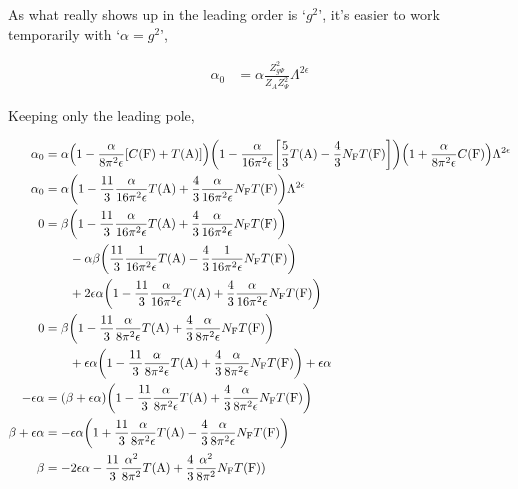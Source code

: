 As what really shows up in the leading order is `$g^2$', it's easier to work temporarily with `$\alpha=g^2$',

\begin{align}
    \alpha_0&=\alpha\frac{Z_{g\Psi}^2}{Z_AZ^2_{\Psi}}\Lambda^{2\epsilon}\nonumber
\end{align}

Keeping only the leading pole,

\begin{align}
    \alpha_0&=\alpha\qty(1-\frac{\alpha}{8\pi^2\epsilon}\qty[C\qty(\textnormal F)+T\qty(\textnormal{A})])
    \qty(1-\frac{\alpha}{16\pi^2\epsilon}\qty[\frac{5}{3}T\qty(\textnormal{A})-\frac43N_{\textnormal{F}}T\qty(\textnormal{F})])
    \qty(1+\frac{\alpha}{8\pi^2\epsilon}C\qty(\textnormal{F}))\Lambda^{2\epsilon}\nonumber\\
    \alpha_0&=\alpha\qty(1-\frac{11}{3}\frac{\alpha}{16\pi^2\epsilon}T\qty(\textnormal{A})
    +\frac43\frac{\alpha}{16\pi^2\epsilon}N_{\textnormal{F}}T\qty(\textnormal{F}))\Lambda^{2\epsilon}\nonumber\\
    0&=\beta\qty(1-\frac{11}{3}\frac{\alpha}{16\pi^2\epsilon}T\qty(\textnormal{A})
    +\frac43\frac{\alpha}{16\pi^2\epsilon}N_{\textnormal{F}}T\qty(\textnormal{F}))\nonumber\\
    &\quad\quad-\alpha\beta\qty(\frac{11}{3}\frac{1}{16\pi^2\epsilon}T\qty(\textnormal{A})
    -\frac43\frac{1}{16\pi^2\epsilon}N_{\textnormal{F}}T\qty(\textnormal{F}))\nonumber\\
    &\quad\quad+2\epsilon\alpha\qty(1-\frac{11}{3}\frac{\alpha}{16\pi^2\epsilon}T\qty(\textnormal{A})
    +\frac43\frac{\alpha}{16\pi^2\epsilon}N_{\textnormal{F}}T\qty(\textnormal{F}))\nonumber\\
    0&=\beta\qty(1-\frac{11}{3}\frac{\alpha}{8\pi^2\epsilon}T\qty(\textnormal{A})
    +\frac43\frac{\alpha}{8\pi^2\epsilon}N_{\textnormal{F}}T\qty(\textnormal{F}))\nonumber\\
    &\quad\quad+\epsilon\alpha\qty(1-\frac{11}{3}\frac{\alpha}{8\pi^2\epsilon}T\qty(\textnormal{A})
    +\frac43\frac{\alpha}{8\pi^2\epsilon}N_{\textnormal{F}}T\qty(\textnormal{F}))+\epsilon\alpha\nonumber\\
    -\epsilon\alpha&=\qty(\beta+\epsilon\alpha)\qty(1-\frac{11}{3}\frac{\alpha}{8\pi^2\epsilon}T\qty(\textnormal{A})
    +\frac43\frac{\alpha}{8\pi^2\epsilon}N_{\textnormal{F}}T\qty(\textnormal{F}))\nonumber\\
    \beta+\epsilon\alpha&=-\epsilon\alpha\qty(1+\frac{11}{3}\frac{\alpha}{8\pi^2\epsilon}T\qty(\textnormal{A})
    -\frac43\frac{\alpha}{8\pi^2\epsilon}N_{\textnormal{F}}T\qty(\textnormal{F}))\nonumber\\
    \beta&=-2\epsilon\alpha-\frac{11}{3}\frac{\alpha^2}{8\pi^2}T\qty(\textnormal{A})
    +\frac43\frac{\alpha^2}{8\pi^2}N_{\textnormal{F}}T\qty(\textnormal{F}))\nonumber
\end{align}

